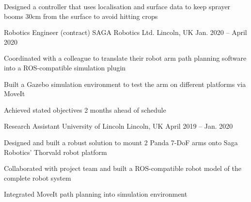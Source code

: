 \documentclass[11pt,a4paper]{awesome-cv}        %
\begin{document}
\begin{cventries}
{\begin{cvitems}
      \item Designed a controller that uses localisation and surface data to keep sprayer booms 30cm from the surface to avoid hitting crops
    \end{cvitems}
  }
  \cventry
  {Robotics Engineer (contract)}
  {SAGA Robotics Ltd.}
  {Lincoln, UK}
  {Jan. 2020 -- April 2020}
  {
    \begin{cvitems}
      \item Coordinated with a colleague to translate their robot arm path planning software into a ROS-compatible simulation plugin 
      \item Built a Gazebo simulation environment to test the arm on different platforms via MoveIt
      \item Achieved stated objectives 2 months ahead of schedule
    \end{cvitems}
  }
  \cventry
  {Research Assistant}
  {University of Lincoln}
  {Lincoln, UK}
  {April 2019 -- Jan. 2020}
  {
    \begin{cvitems}
      \item Designed and built a robust solution to mount 2 Panda 7-DoF arms onto Saga Robotics' Thorvald robot platform
      \item Collaborated with project team and built a ROS-compatible robot model of the complete robot system 
      \item Integrated MoveIt path planning into simulation environment
    \end{cvitems}
  }
\end{cventries}

\end{document}
